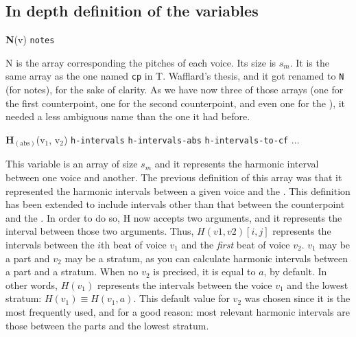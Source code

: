 \subsection{In depth definition of the variables} \label{section:definition-variables}

\vspace{.5cm} \noindent \textbf{N}(v) \hspace{.2cm} \texttt{notes} 

N is the array corresponding the pitches of each voice. Its size is $s_m$. It is the same array as the one named \texttt{cp} in T. Wafflard's thesis, and it got renamed to \texttt{N} (for notes), for the sake of clarity. As we have now three of those arrays (one for the first counterpoint, one for the second counterpoint, and even one for the \cf), it needed a less ambiguous name than the one it had before.




\vspace{.5cm} \noindent \textbf{H}$_{(\text{abs})}$(v$_1$, v$_2$) \hspace{.2cm} \texttt{h-intervals}\hspace{.2cm} \texttt{h-intervals-abs}\hspace{.2cm} \texttt{h-intervals-to-cf}\hspace{.2cm}  ...

This variable is an array of size $s_m$ and it represents the harmonic interval between one voice and another. The previous definition of this array was that it represented the harmonic intervals between a given voice and the \cf. This definition has been extended to include intervals other than that between the counterpoint and the \cf. In order to do so, H now accepts two arguments, and it represents the interval between those two arguments. Thus, $H(v1,v2)[i,j]$ represents the intervals between the $i$th beat of voice $v_1$ and the \textit{first} beat of voice $v_2$. $v_1$ may be a part and $v_2$ may be a stratum, as you can calculate harmonic intervals between a part and a stratum. When no $v_2$ is precised, it is equal to $a$, by default. In other words, $H(v_1)$ represents the intervals between the voice $v_1$ and the lowest stratum: $H(v_1) \equiv H(v_1,a)$. This default value for $v_2$ was chosen since it is the most frequently used, and for a good reason: most relevant harmonic intervals are those between the parts and the lowest stratum.

